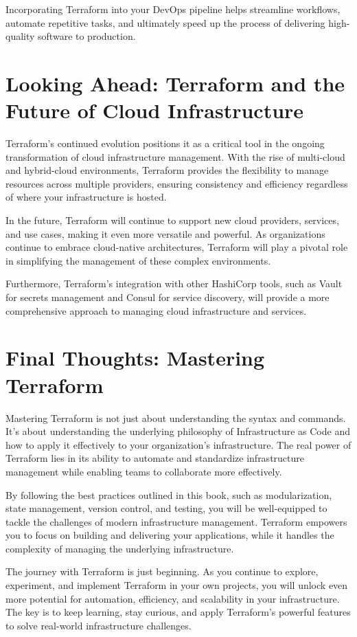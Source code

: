Incorporating Terraform into your DevOps pipeline helps streamline workflows, automate repetitive tasks, and ultimately speed up the process of delivering high-quality software to production.

\section{Looking Ahead: Terraform and the Future of Cloud Infrastructure}

Terraform's continued evolution positions it as a critical tool in the ongoing transformation of cloud infrastructure management. With the rise of multi-cloud and hybrid-cloud environments, Terraform provides the flexibility to manage resources across multiple providers, ensuring consistency and efficiency regardless of where your infrastructure is hosted.

In the future, Terraform will continue to support new cloud providers, services, and use cases, making it even more versatile and powerful. As organizations continue to embrace cloud-native architectures, Terraform will play a pivotal role in simplifying the management of these complex environments.

Furthermore, Terraform's integration with other HashiCorp tools, such as Vault for secrets management and Consul for service discovery, will provide a more comprehensive approach to managing cloud infrastructure and services.

\section{Final Thoughts: Mastering Terraform}

Mastering Terraform is not just about understanding the syntax and commands. It's about understanding the underlying philosophy of Infrastructure as Code and how to apply it effectively to your organization's infrastructure. The real power of Terraform lies in its ability to automate and standardize infrastructure management while enabling teams to collaborate more effectively.

By following the best practices outlined in this book, such as modularization, state management, version control, and testing, you will be well-equipped to tackle the challenges of modern infrastructure management. Terraform empowers you to focus on building and delivering your applications, while it handles the complexity of managing the underlying infrastructure.

The journey with Terraform is just beginning. As you continue to explore, experiment, and implement Terraform in your own projects, you will unlock even more potential for automation, efficiency, and scalability in your infrastructure. The key is to keep learning, stay curious, and apply Terraform's powerful features to solve real-world infrastructure challenges.


